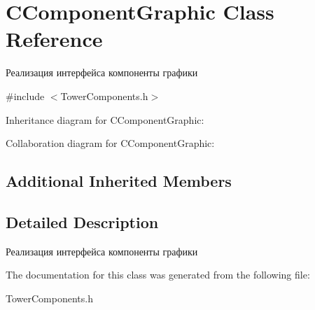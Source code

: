 \hypertarget{classCComponentGraphic}{}\section{C\+Component\+Graphic Class Reference}
\label{classCComponentGraphic}


Реализация интерфейса компоненты графики  




{\ttfamily \#include $<$Tower\+Components.\+h$>$}



Inheritance diagram for C\+Component\+Graphic\+:


Collaboration diagram for C\+Component\+Graphic\+:
\subsection*{Additional Inherited Members}


\subsection{Detailed Description}
Реализация интерфейса компоненты графики 

The documentation for this class was generated from the following file\+:\begin{DoxyCompactItemize}
\item 
Tower\+Components.\+h\end{DoxyCompactItemize}
